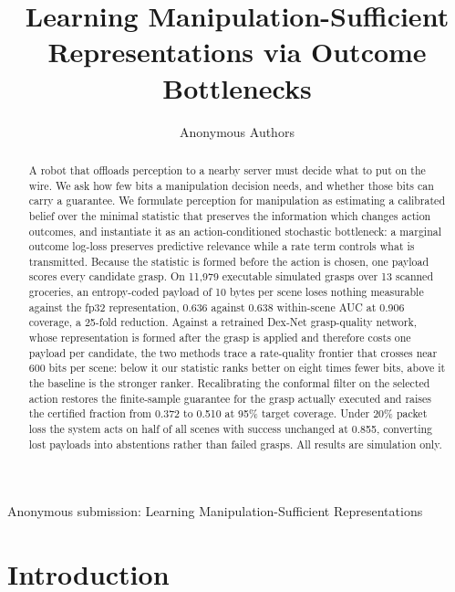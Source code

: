 \documentclass[letterpaper, 10pt, conference]{ieeeconf}
\begin{document}
\title{Learning Manipulation-Sufficient Representations via Outcome
Bottlenecks}

\author{Anonymous Authors}

\markboth{}%
{Anonymous submission: Learning Manipulation-Sufficient Representations}

\maketitle

\begin{abstract}
A robot that offloads perception to a nearby server must decide what to put on the
wire. We ask how few bits a manipulation decision needs, and whether those bits can
carry a guarantee. We formulate perception for manipulation as estimating a calibrated
belief over the minimal statistic that preserves the information which changes action
outcomes, and instantiate it as an action-conditioned stochastic bottleneck: a marginal
outcome log-loss preserves predictive relevance while a rate term controls what is
transmitted. Because the statistic is formed before the action is chosen, one payload
scores every candidate grasp. On 11{,}979 executable simulated grasps over 13 scanned
groceries, an entropy-coded payload of 10 bytes per scene loses nothing measurable
against the fp32 representation, 0.636 against 0.638 within-scene AUC at 0.906 coverage,
a 25-fold reduction. Against a retrained Dex-Net grasp-quality network, whose
representation is formed after the grasp is applied and therefore costs one payload per
candidate, the two methods trace a rate-quality frontier that crosses near 600 bits per
scene: below it our statistic ranks better on eight times fewer bits, above it the
baseline is the stronger ranker. Recalibrating the conformal filter on the selected
action restores the finite-sample guarantee for the grasp actually executed and raises
the certified fraction from 0.372 to 0.510 at 95\% target coverage. Under 20\% packet
loss the system acts on half of all scenes with success unchanged at 0.855, converting
lost payloads into abstentions rather than failed grasps. All results are simulation
only.
\end{abstract}


\IEEEpeerreviewmaketitle

\section{Introduction}
\end{document}
